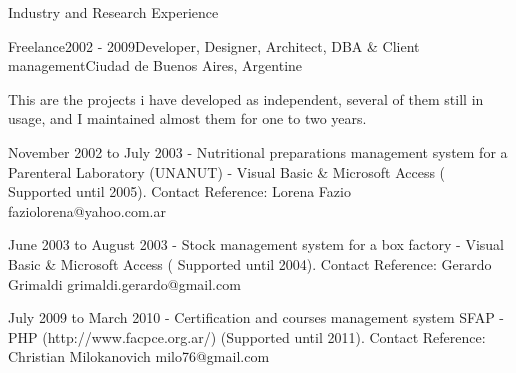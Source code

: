 \documentclass{resume} %
\begin{document}
\begin{rSection}{Industry and Research Experience}
\begin{rSubsection}{Freelance}{2002 - 2009}{Developer, Designer, Architect, DBA \& Client management}{Ciudad de Buenos Aires, Argentine}
	\item This are the projects i have developed as independent, several of them still in usage, and I maintained almost them for one to two years. 
	\item  November 2002 to July 2003 - Nutritional preparations management system for a Parenteral Laboratory (UNANUT) -  Visual Basic \& Microsoft Access ( Supported until 2005). Contact Reference: Lorena Fazio faziolorena@yahoo.com.ar
	\item  June 2003 to August 2003 - Stock management system for a box factory  - Visual Basic \& Microsoft Access ( Supported until 2004). Contact Reference: Gerardo Grimaldi grimaldi.gerardo@gmail.com
	\item  July 2009 to March 2010 - Certification and courses management system SFAP -  PHP (http://www.facpce.org.ar/)  (Supported until 2011). Contact Reference: Christian Milokanovich milo76@gmail.com
\end{rSubsection}



\end{rSection}
\end{document}
